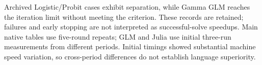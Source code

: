 \documentclass[10pt,a4paper]{article}
\begin{document}
Archived Logistic/Probit cases exhibit separation, while Gamma GLM reaches the
iteration limit without meeting the criterion. These records are retained;
failures and early stopping are not interpreted as successful-solve speedups.
Main native tables use five-round repeats; GLM and Julia use initial three-run
measurements from different periods. Initial timings showed substantial machine
speed variation, so cross-period differences do not establish language superiority.
\end{document}
